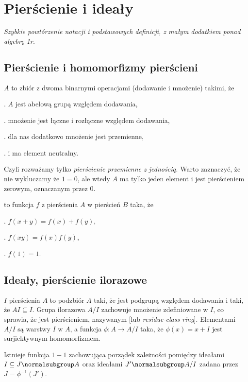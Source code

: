 \section{Pierścienie i ideały}
\emph{Szybkie powtórzenie notacji i podstawowych definicji, z małym dodatkiem ponad algebrę 1r.}

\subsection{Pierścienie i homomorfizmy pierścieni}

 $A$ to zbiór z dwoma binarnymi operacjami (dodawanie i mnożenie) takimi, że
\smallskip

. $A$ jest abelową grupą względem dodawania,

. mnożenie jest łączne i rozłączne względem dodawania,

. dla nas dodatkowo mnożenie jest przemienne,

. i ma element neutralny.
\smallskip

Czyli rozważamy tylko \emph{pierścienie przemienne z jednością}. Warto zaznaczyć, że nie wykluczamy że $1=0$, ale wtedy $A$ ma tylko jeden element i jest pierścieniem zerowym, oznaczanym przez $0$.
\medskip

 to funkcja $f$ z pierścienia $A$ w pierścień $B$ taka, że
\smallskip

. $f(x+y)=f(x)+f(y)$,

. $f(xy)=f(x)f(y)$,

. $f(1)=1$.

\subsection{Ideały, pierścienie ilorazowe}

 $I$ pierścienia $A$ to podzbiór $A$ taki, że jest podgrupą względem dodawania i taki, że $AI\subseteq I$. Grupa ilorazowa $A/I$ zachowuje mnożenie zdefiniowane w $I$, co sprawia, że jest pierścieniem, nazywanym  [lub \emph{residue-class ring}]. Elementami $A/I$ są warstwy $I$ w $A$, a funkcja $\phi:A\to A/I$ taka, że $\phi(x)=x+I$ jest surjiektywnym homomorfizmem.
\smallskip

 Istnieje funkcja $1-1$ zachowująca porządek zależności pomiędzy ideałami $I\subseteq J\normalsubgroup A$ oraz ideałami $J'\normalsubgroup A/I$ zadana przez $J=\phi^{-1}(J')$.

